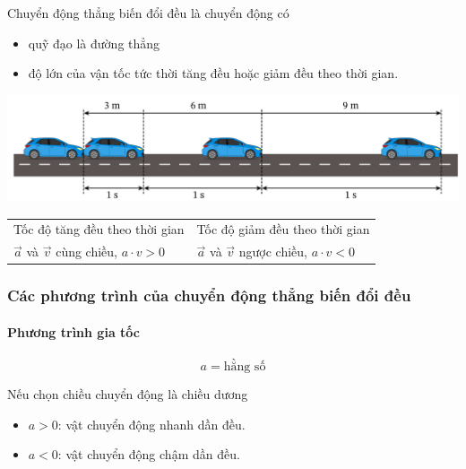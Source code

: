 \begin{tomtat}
Chuyển động thẳng biến đổi đều là chuyển động có 
\begin{itemize}
	\item quỹ đạo là đường thẳng
	\item độ lớn của vận tốc tức thời tăng đều hoặc giảm đều theo thời gian.
\end{itemize}  
\begin{center}
	\includegraphics[scale=0.5]{figs/G10Y25B6-9}
\end{center}
\begin{center}
	\begin{tabular}{|m{20em}|m{20em}|}
		\hline
		\thead{Chuyển động thẳng nhanh dần đều} & \thead{Chuyển động thẳng chậm dần đều}\\
		\hline
		Tốc độ tăng đều theo thời gian & Tốc độ giảm đều theo thời gian\\
		$\vec{a}$ và $\vec{v}$ cùng chiều, $a\cdot v>0$ & $\vec{a}$ và $\vec{v}$ ngược chiều, $a\cdot v<0$\\
		\hline
	\end{tabular}
\end{center}
\subsubsection{Các phương trình của chuyển động thẳng biến đổi đều}
\paragraph{Phương trình gia tốc}
$$a=\text{hằng số}$$
\begin{luuy}
	Nếu chọn chiều chuyển động là chiều dương
	\begin{itemize}
		\item $a>0$: vật chuyển động nhanh dần đều.
		\item $a<0$: vật chuyển động chậm dần đều.
	\end{itemize}
\end{luuy}

\end{tomtat}
